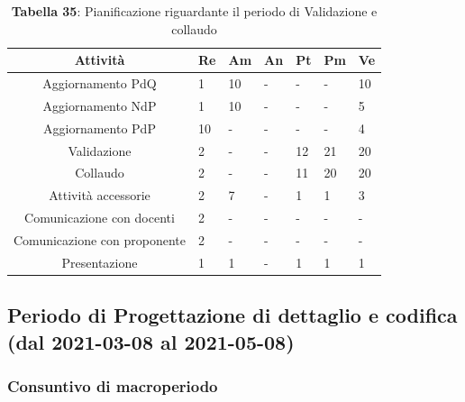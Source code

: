 \begin{table}[H]
	\centering
	\renewcommand{\arraystretch}{1.5}
	\begin{tabular}{|c|p{10mm}|p{10mm}|p{10mm}|p{10mm}|p{10mm}|p{10mm}|}
		\hline
		\rowcolor{lighter-grayer}
		Attività & Re & Am & An & Pt & Pm & Ve \\ \hline
		Aggiornamento PdQ          & 1  & 10 & - & - & - & 10 \\ \hline
		Aggiornamento NdP          & 1  & 10 & - & - & - & 5  \\ \hline
		Aggiornamento PdP          & 10 & - & - & - & - & 4  \\ \hline
		Validazione                & 2  & - & - & 12 & 21 & 20 \\ \hline
		Collaudo                   & 2  & - & - & 11 & 20 & 20 \\ \hline
		Attività accessorie 	   & 2  & 7  & - & 1  & 1  & 3  \\ \hline
		Comunicazione con docenti  & 2  & - & - & - & - & -   \\ \hline
		Comunicazione con proponente& 2  & - & - & - & - & -   \\ \hline
		Presentazione              & 1  & 1  & - & 1  & 1  & 1 \\
		\hline
	\end{tabular}
	\caption*{\textbf{Tabella 35}: Pianificazione riguardante il periodo di Validazione e collaudo\\}
\end{table}

\subsection{Periodo di Progettazione di dettaglio e codifica (dal 2021-03-08 al 2021-05-08) }
\subsubsection{Consuntivo di macroperiodo}

